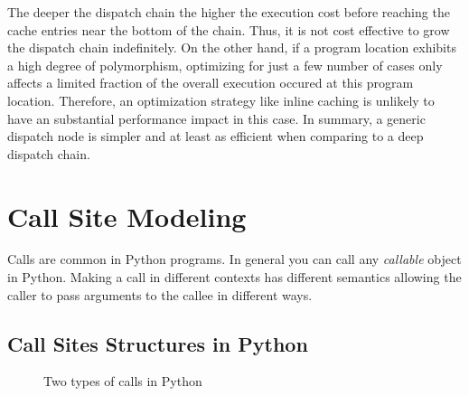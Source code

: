 The deeper the dispatch chain the higher the execution cost before reaching the cache entries near the bottom of the chain.
Thus, it is not cost effective to grow the dispatch chain indefinitely.
On the other hand, if a program location exhibits a high degree of polymorphism, optimizing for just a few number of cases only affects a limited fraction of the overall execution occured at this program location.
Therefore, an optimization strategy like inline caching is unlikely to have an substantial performance impact in this case.
In summary, a generic dispatch node is simpler and at least as efficient when comparing to a deep dispatch chain.

\section{Call Site Modeling}

Calls are common in Python programs.
In general you can call any \emph{callable} object in Python.
Making a call in different contexts has different semantics allowing the caller to pass arguments to the callee in different ways.

\subsection{Call Sites Structures in Python}
\label{sec:ch5-structure-of-call-sites}

\begin{figure}
\centering
{}
\caption{Two types of calls in Python}
\label{fig:ch5-call-site-synteax-code}
\end{figure}

